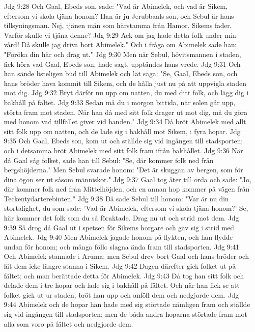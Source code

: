 Jdg 9:28  Och Gaal, Ebeds son, sade: "Vad är Abimelek, och vad är Sikem, eftersom vi skola tjäna honom? Han är ju Jerubbaals son, och Sebul är hans tillsyningsman. Nej, tjänen män som härstamma från Hamor, Sikems fader. Varför skulle vi tjäna denne?
Jdg 9:29  Ack om jag hade detta folk under min vård! Då skulle jag driva bort Abimelek." Och i fråga om Abimelek sade han: "Föröka din här och drag ut."
Jdg 9:30  Men när Sebul, hövitsmannen i staden, fick höra vad Gaal, Ebeds son, hade sagt, upptändes hans vrede.
Jdg 9:31  Och han sände listeligen bud till Abimelek och lät säga: "Se, Gaal, Ebeds son, och hans bröder hava kommit till Sikem, och de hålla just nu på att uppvigla staden mot dig.
Jdg 9:32  Bryt därför nu upp om natten, du med ditt folk, och lägg dig i bakhåll på fältet.
Jdg 9:33  Sedan må du i morgon bittida, när solen går upp, störta fram mot staden. När han då med sitt folk drager ut mot dig, må du göra med honom vad tillfället giver vid handen."
Jdg 9:34  Då bröt Abimelek med allt sitt folk upp om natten, och de lade sig i bakhåll mot Sikem, i fyra hopar.
Jdg 9:35  Och Gaal, Ebeds son, kom ut och ställde sig vid ingången till stadsporten; och i detsamma bröt Abimelek med sitt folk fram ifrån bakhållet.
Jdg 9:36  När då Gaal såg folket, sade han till Sebul: "Se, där kommer folk ned från bergshöjderna." Men Sebul svarade honom: "Det är skuggan av bergen, som för dina ögon ser ut såsom människor."
Jdg 9:37  Gaal tog åter till orda och sade: "Jo, där kommer folk ned från Mittelhöjden, och en annan hop kommer på vägen från Teckentydarterebinten."
Jdg 9:38  Då sade Sebul till honom: "Var är nu din stortalighet, du som sade: 'Vad är Abimelek, eftersom vi skola tjäna honom?' Se, här kommer det folk som du så föraktade. Drag nu ut och strid mot dem.
Jdg 9:39  Så drog då Gaal ut i spetsen för Sikems borgare och gav sig i strid med Abimelek.
Jdg 9:40  Men Abimelek jagade honom på flykten, och han flydde undan för honom; och många föllo slagna ända fram till stadsporten.
Jdg 9:41  Och Abimelek stannade i Aruma; men Sebul drev bort Gaal och hans bröder och lät dem icke längre stanna i Sikem.
Jdg 9:42  Dagen därefter gick folket ut på fältet; och man berättade detta för Abimelek.
Jdg 9:43  Då tog han sitt folk och delade dem i tre hopar och lade sig i bakhåll på fältet. Och när han fick se att folket gick ut ur staden, bröt han upp och anföll dem och nedgjorde dem.
Jdg 9:44  Abimelek och de hopar han hade med sig störtade nämligen fram och ställde sig vid ingången till stadsporten; men de båda andra hoparna störtade fram mot alla som voro på fältet och nedgjorde dem.
